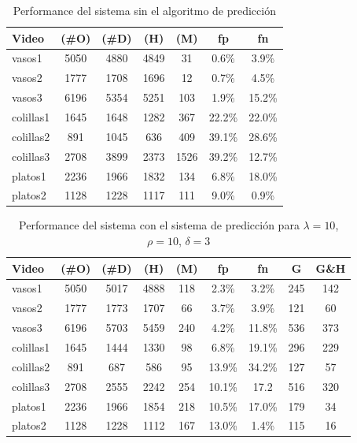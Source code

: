 \begin{table}[htb]
  \begin{tabular}{|l | c | c | c | c | c | c |}
	\hline  
	\textbf{Video} & \textbf{(\#O)} &  \textbf{(\#D)} & \textbf{(H)} & 
	\textbf{(M)} & \textbf{fp} & \textbf{fn}\\
	\hline
	\hline
	vasos1 & 5050 & 4880 & 4849 & 31 & 0.6\% & 3.9\% \\
	vasos2 & 1777 & 1708 & 1696 & 12 & 0.7\% & 4.5\% \\	
	vasos3 & 6196 & 5354 & 5251 & 103 & 1.9\% & 15.2\% \\
	\hline
	colillas1 & 1645 & 1648 & 1282 & 367 & 22.2\% & 22.0\% \\
	colillas2 & 891 & 1045 & 636 &  409 & 39.1\% & 28.6\% \\
	colillas3 & 2708 & 3899 & 2373 & 1526 & 39.2\% & 12.7\% \\
	\hline
	platos1 & 2236 & 1966 & 1832 & 134 & 6.8\% & 18.0\%\\
	platos2 & 1128 & 1228 & 1117 & 111& 9.0\% & 0.9\% \\
	\hline
	\end{tabular}
	\caption{\label{tab:result} Performance del sistema sin el algoritmo de predicción}
\end{table}

\begin{table}[htb]
  \begin{tabular}{|l | c | c | c | c | c | c | c | c |}
	\hline  
	\textbf{Video} & \textbf{(\#O)} &  \textbf{(\#D)} & \textbf{(H)} & \textbf{(M)} & \textbf{fp} & \textbf{fn} & \textbf{G} & \textbf{G\&H} \\
	\hline
	\hline
	vasos1 & 5050 & 5017 & 4888 & 118 & 2.3\% & 3.2\%  & 245 & 142\\
	vasos2 & 1777 & 1773 & 1707 & 66 & 3.7\% & 3.9\% & 121 & 60 \\
	vasos3 & 6196 & 5703 & 5459 & 240 & 4.2\% & 11.8\% & 536 & 373 \\
	\hline
	colillas1 & 1645 & 1444 & 1330 & 98 & 6.8\% & 19.1\% & 296 & 229 \\
	colillas2 & 891 & 687 & 586 & 95 & 13.9\% & 34.2\% & 127 & 57 \\
	colillas3 & 2708 & 2555 & 2242 & 254 & 10.1\% & 17.2  & 516 & 320\\
	\hline
	platos1 & 2236 & 1966 & 1854 & 218 & 10.5\% & 17.0\% & 179 & 34\\
	platos2 & 1128 & 1228 & 1112 & 167& 13.0\% & 1.4\% & 115 & 16\\
	\hline
	\end{tabular}
	\caption{\label{tab:pred} Performance del sistema con el sistema de predicción para 
	$\lambda=10$, $\rho=10$, $\delta=3$ }
\end{table}

